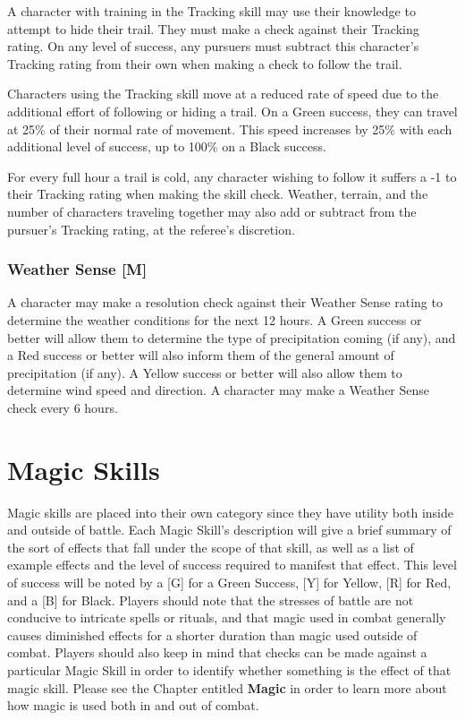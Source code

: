 \documentclass[oneside]{book}
\begin{document}
\begin{multicols}{2}
A character with training in the Tracking skill may use their knowledge to attempt to hide their trail. They must make a check against their Tracking rating. On any level of success, any pursuers must subtract this character's Tracking rating from their own when making a check to follow the trail. 

Characters using the Tracking skill move at a reduced rate of speed due to the additional effort of following or hiding a trail. On a Green success, they can travel at 25\% of their normal rate of movement. This speed increases by 25\% with each additional level of success, up to 100\% on a Black success.

For every full hour a trail is cold, any character wishing to follow it suffers a -1 to their Tracking rating when making the skill check. Weather, terrain, and the number of characters traveling together may also add or subtract from the pursuer's Tracking rating, at the referee's discretion.

\subsubsection{Weather Sense [M]}
A character may make a resolution check against their Weather Sense rating to determine the weather conditions for the next 12 hours. A Green success or better will allow them to determine the type of precipitation coming (if any), and a Red success or better will also inform them of the general amount of precipitation (if any). A Yellow success or better will also allow them to determine wind speed and direction. A character may make a Weather Sense check every 6 hours.

\section{Magic Skills}
Magic skills are placed into their own category since they have utility both inside and outside of battle. Each Magic Skill's description will give a brief summary of the sort of effects that fall under the scope of that skill, as well as a list of example effects and the level of success required to manifest that effect. This level of success will be noted by a [G] for a Green Success, [Y] for Yellow, [R] for Red, and a [B] for Black. Players should note that the stresses of battle are not conducive to intricate spells or rituals, and that magic used in combat generally causes diminished effects for a shorter duration than magic used outside of combat. Players should also keep in mind that checks can be made against a particular Magic Skill in order to identify whether something is the effect of that magic skill. Please see the Chapter entitled \textbf{Magic} in order to learn more about how magic is used both in and out of combat. 


\end{multicols}
\end{document}
